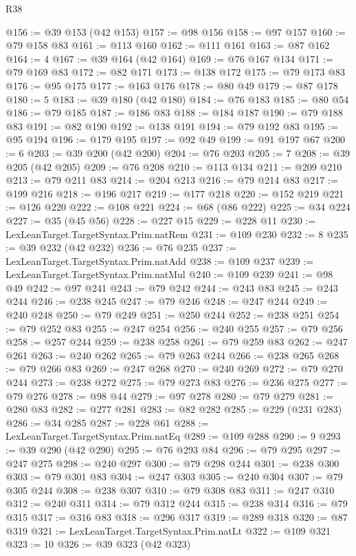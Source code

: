 \begin{lexlean}{R38}
\begin{coremodule}
@156 := @39 @153 (@42 @153)
@157 := @98 @156
@158 := @97 @157
@160 := @79 @158 @83
@161 := @113 @160
@162 := @111 @161
@163 := @87 @162
@164 := 4
@167 := @39 @164 (@42 @164)
@169 := @76 @167 @134
@171 := @79 @169 @83
@172 := @82 @171
@173 := @138 @172
@175 := @79 @173 @83
@176 := @95 @175
@177 := @163 @176
@178 := @80 @49
@179 := @87 @178
@180 := 5
@183 := @39 @180 (@42 @180)
@184 := @76 @183
@185 := @80 @54
@186 := @79 @185
@187 := @186 @83
@188 := @184 @187
@190 := @79 @188 @83
@191 := @82 @190
@192 := @138 @191
@194 := @79 @192 @83
@195 := @95 @194
@196 := @179 @195
@197 := @92 @49
@199 := @91 @197 @67
@200 := 6
@203 := @39 @200 (@42 @200)
@204 := @76 @203
@205 := 7
@208 := @39 @205 (@42 @205)
@209 := @76 @208
@210 := @113 @134
@211 := @209 @210
@213 := @79 @211 @83
@214 := @204 @213
@216 := @79 @214 @83
@217 := @199 @216
@218 := @196 @217
@219 := @177 @218
@220 := @152 @219
@221 := @126 @220
@222 := @108 @221
@224 := @68 (@86 @222)
@225 := @34 @224
@227 := @35 (@45 @56)
@228 := @227 @15
@229 := @228 @11
@230 := LexLeanTarget.TargetSyntax.Prim.natRem
@231 := @109 @230
@232 := 8
@235 := @39 @232 (@42 @232)
@236 := @76 @235
@237 := LexLeanTarget.TargetSyntax.Prim.natAdd
@238 := @109 @237
@239 := LexLeanTarget.TargetSyntax.Prim.natMul
@240 := @109 @239
@241 := @98 @49
@242 := @97 @241
@243 := @79 @242
@244 := @243 @83
@245 := @243 @244
@246 := @238 @245
@247 := @79 @246
@248 := @247 @244
@249 := @240 @248
@250 := @79 @249
@251 := @250 @244
@252 := @238 @251
@254 := @79 @252 @83
@255 := @247 @254
@256 := @240 @255
@257 := @79 @256
@258 := @257 @244
@259 := @238 @258
@261 := @79 @259 @83
@262 := @247 @261
@263 := @240 @262
@265 := @79 @263 @244
@266 := @238 @265
@268 := @79 @266 @83
@269 := @247 @268
@270 := @240 @269
@272 := @79 @270 @244
@273 := @238 @272
@275 := @79 @273 @83
@276 := @236 @275
@277 := @79 @276
@278 := @98 @44
@279 := @97 @278
@280 := @79 @279
@281 := @280 @83
@282 := @277 @281
@283 := @82 @282
@285 := @229 (@231 @283)
@286 := @34 @285
@287 := @228 @61
@288 := LexLeanTarget.TargetSyntax.Prim.natEq
@289 := @109 @288
@290 := 9
@293 := @39 @290 (@42 @290)
@295 := @76 @293 @84
@296 := @79 @295
@297 := @247 @275
@298 := @240 @297
@300 := @79 @298 @244
@301 := @238 @300
@303 := @79 @301 @83
@304 := @247 @303
@305 := @240 @304
@307 := @79 @305 @244
@308 := @238 @307
@310 := @79 @308 @83
@311 := @247 @310
@312 := @240 @311
@314 := @79 @312 @244
@315 := @238 @314
@316 := @79 @315
@317 := @316 @83
@318 := @296 @317
@319 := @289 @318
@320 := @87 @319
@321 := LexLeanTarget.TargetSyntax.Prim.natLt
@322 := @109 @321
@323 := 10
@326 := @39 @323 (@42 @323)

\end{coremodule}
\end{lexlean}
